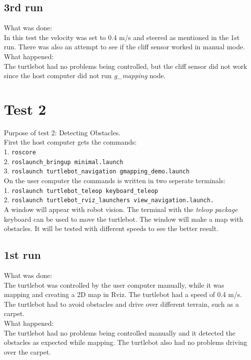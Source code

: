 \subsection{3rd run}
What was done: \\
In this test the velocity was set to 0.4 m/s and steered as mentioned in the 1st run. There was also an attempt to see if the cliff sensor worked in manual mode.\\
What happened:\\
The turtlebot had no problems being controlled, but the cliff sensor did not work since the host computer did not run \textit{g\_mapping} node. 



%
%

\section{Test 2}
Purpose of test 2: Detecting Obstacles.\\ 
First the host computer gets the commands:\\
1. \texttt{roscore}\\
2. \texttt{roslaunch\_bringup minimal.launch}\\
3. \texttt{roslaunch turtlebot\_navigation gmapping\_demo.launch}\\
On the user computer the commands is written in two seperate terminals:\\
1. \texttt{roslaunch turtlebot\_teleop keyboard\_teleop}\\
2. \texttt{roslaunch turtlebot\_rviz\_launchers view\_navigation.launch.}\\
A window will appear with robot vision. The terminal with the \textit{teleop package} keyboard can be used to move the turtlebot. The window will make a map with obstacles.
It will be tested with different speeds to see the better result.

\subsection{1st run}
What was done:\\
The turtlebot was controlled by the user computer manually, while it was mapping and creating a 2D map in Rviz. The turtlebot had a speed of 0.4 m/s. The turtlebot had to avoid obstacles and drive over different terrain, such as a carpet.\\
What happened:\\
The turtlebot had no problems being controlled manually and it detected the obstacles as expected while mapping. The turtlebot also had no problems driving over the carpet.

